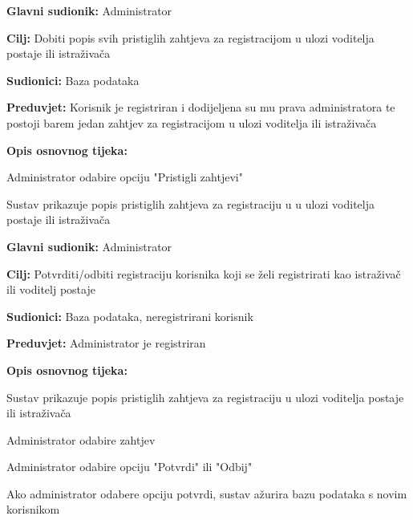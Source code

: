 					\noindent {}
					\begin{packed_item}
						
						\item \textbf{Glavni sudionik:} Administrator
						\item \textbf{Cilj:} Dobiti popis svih pristiglih zahtjeva za registracijom u ulozi voditelja postaje ili istraživača
						\item \textbf{Sudionici:} Baza podataka
						\item \textbf{Preduvjet:} Korisnik je registriran i dodijeljena su mu prava administratora te postoji barem jedan zahtjev za registracijom u ulozi voditelja ili istraživača
						\item \textbf{Opis osnovnog tijeka:}
						
						\item[] \begin{packed_enum}
							
							\item Administrator odabire opciju "Pristigli zahtjevi"
							\item Sustav prikazuje popis pristiglih zahtjeva za registraciju u u ulozi voditelja postaje ili istraživača 
						\end{packed_enum}
					\end{packed_item}
					
					\eject
					
					\noindent \underbar{\textbf{UC25 - Potvrda registracije}}
					\begin{packed_item}
						
						\item \textbf{Glavni sudionik:} Administrator
						\item \textbf{Cilj:} Potvrditi/odbiti registraciju korisnika koji se želi registrirati kao istraživač ili voditelj postaje
						\item \textbf{Sudionici:} Baza podataka, neregistrirani korisnik
						\item \textbf{Preduvjet:} Administrator je registriran 
						\item \textbf{Opis osnovnog tijeka:}
						
						\item[] \begin{packed_enum}
							
							\item Sustav prikazuje popis pristiglih zahtjeva za registraciju u ulozi voditelja postaje ili istraživača
							\item Administrator odabire zahtjev 
							\item Administrator odabire opciju "Potvrdi" ili "Odbij"
							\item Ako administrator odabere opciju potvrdi, sustav ažurira bazu podataka s novim korisnikom
						\end{packed_enum}
					\end{packed_item}
					

